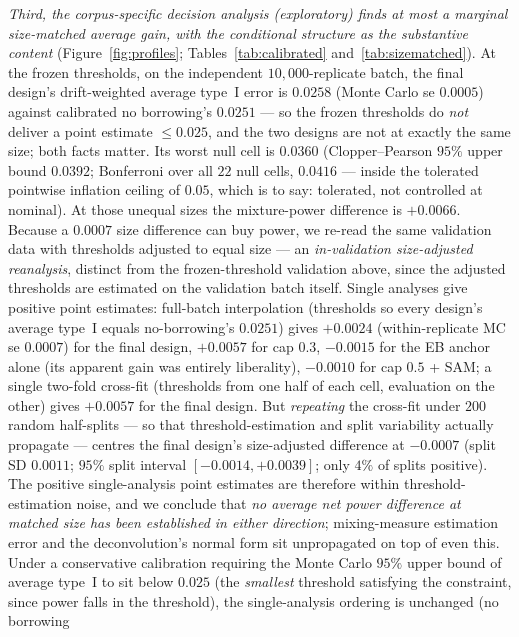 \documentclass[11pt]{article}
\begin{document}
\emph{Third, the corpus-specific decision analysis (exploratory) finds at
most a marginal size-matched average gain, with the conditional structure
as the substantive content} (Figure~\ref{fig:profiles};
Tables~\ref{tab:calibrated} and~\ref{tab:sizematched}). At the frozen
thresholds, on the independent $10{,}000$-replicate batch, the final
design's drift-weighted average type~I error is $0.0258$ (Monte Carlo se
$0.0005$) against calibrated no borrowing's $0.0251$ --- so the frozen
thresholds do \emph{not} deliver a point estimate $\le 0.025$, and the two
designs are not at exactly the same size; both facts matter. Its worst
null cell is $0.0360$ (Clopper--Pearson $95\%$ upper bound $0.0392$;
Bonferroni over all $22$ null cells, $0.0416$ --- inside the tolerated
pointwise inflation ceiling of $0.05$, which is to say: tolerated, not
controlled at nominal). At those unequal sizes the mixture-power
difference is $+0.0066$. Because a $0.0007$ size difference can buy power,
we re-read the same validation data with thresholds adjusted to equal
size --- an \emph{in-validation size-adjusted reanalysis}, distinct from
the frozen-threshold validation above, since the adjusted thresholds are
estimated on the validation batch itself. Single analyses give positive
point estimates: full-batch interpolation (thresholds so every design's
average type~I equals no-borrowing's $0.0251$) gives $+0.0024$
(within-replicate MC se $0.0007$) for the final design, $+0.0057$ for cap
$0.3$, $-0.0015$ for the EB anchor alone (its apparent gain was entirely
liberality), $-0.0010$ for cap $0.5$ + SAM; a single two-fold cross-fit
(thresholds from one half of each cell, evaluation on the other) gives
$+0.0057$ for the final design. But \emph{repeating} the cross-fit under
$200$ random half-splits --- so that threshold-estimation and split
variability actually propagate --- centres the final design's
size-adjusted difference at $-0.0007$ (split SD $0.0011$; $95\%$ split
interval $[-0.0014, +0.0039]$; only $4\%$ of splits positive). The
positive single-analysis point estimates are therefore within
threshold-estimation noise, and we conclude that \emph{no average net
power difference at matched size has been established in either
direction}; mixing-measure estimation error and the deconvolution's
normal form sit unpropagated on top of even this. Under a conservative
calibration requiring the Monte Carlo $95\%$ upper bound of average
type~I to sit below $0.025$ (the \emph{smallest} threshold satisfying the
constraint, since power falls in the threshold), the single-analysis
ordering is unchanged (no borrowing
\end{document}

